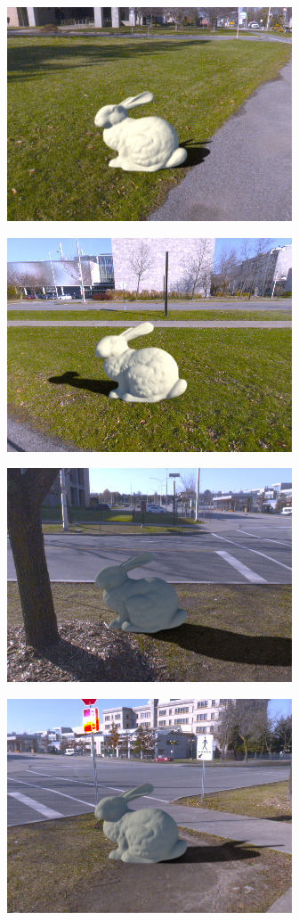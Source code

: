 \begin{minipage}{\linewidth}
\begin{multicols}{4}
\includegraphics[width=\mywidth]{AG8A2833_Panorama_hdr-corrected_006.jpg}

\includegraphics[width=\mywidth]{AG8A2833_Panorama_hdr-corrected_007.jpg}

\includegraphics[width=\mywidth]{AG8A2875_Panorama_hdr-corrected_003.jpg}

\includegraphics[width=\mywidth]{AG8A2875_Panorama_hdr-corrected_005.jpg}


\end{multicols}
\end{minipage}
